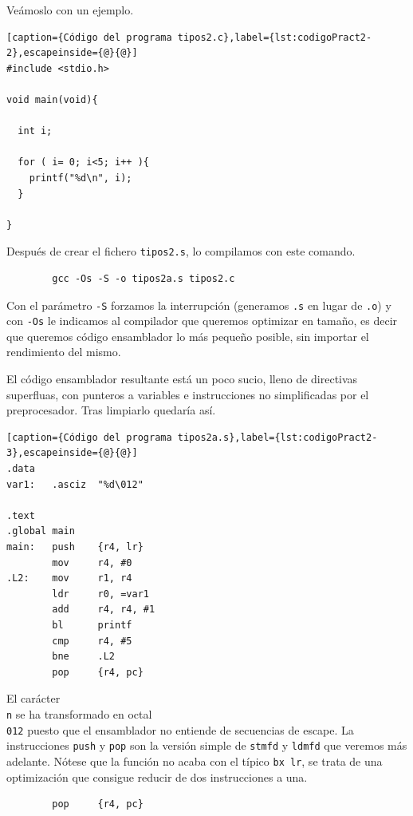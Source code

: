 Veámoslo con un ejemplo.

\begin{lstlisting}[caption={Código del programa tipos2.c},label={lst:codigoPract2-2},escapeinside={@}{@}]
#include <stdio.h>

void main(void){

  int i;

  for ( i= 0; i<5; i++ ){
    printf("%d\n", i);
  }

}
\end{lstlisting}

Después de crear el fichero {\tt tipos2.s}, lo compilamos con este comando.

\begin{lstlisting}
        gcc -Os -S -o tipos2a.s tipos2.c
\end{lstlisting}

Con el parámetro {\tt -S} forzamos la interrupción (generamos {\tt .s} en lugar de
{\tt .o}) y con {\tt -Os} le indicamos al compilador que queremos optimizar en
tamaño, es decir que queremos código ensamblador lo más pequeño posible, sin
importar el rendimiento del mismo.

El código ensamblador resultante está un poco sucio, lleno de directivas superfluas,
con punteros a variables e instrucciones no simplificadas por el preprocesador. Tras
limpiarlo quedaría así.

\begin{lstlisting}[caption={Código del programa tipos2a.s},label={lst:codigoPract2-3},escapeinside={@}{@}]
.data
var1:   .asciz  "%d\012"

.text
.global main
main:   push    {r4, lr}
        mov     r4, #0
.L2:    mov     r1, r4
        ldr     r0, =var1
        add     r4, r4, #1
        bl      printf
        cmp     r4, #5
        bne     .L2
        pop     {r4, pc}
\end{lstlisting}

El carácter {\tt \\n} se ha transformado en octal {\tt \\012} puesto que el ensamblador
no entiende de secuencias de escape. La instrucciones {\tt push} y {\tt pop} son la versión
simple de {\tt stmfd} y {\tt ldmfd} que veremos más adelante. Nótese que la función no acaba
con el típico {\tt bx lr}, se trata de una optimización que consigue reducir de dos
instrucciones a una.

\begin{lstlisting}
        pop     {r4, pc}
\end{lstlisting}

